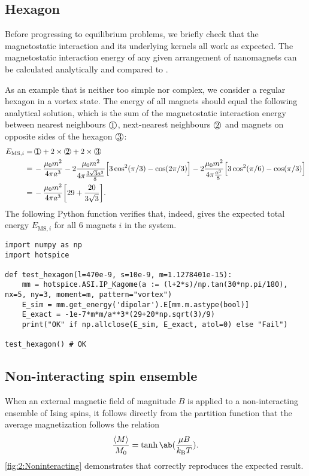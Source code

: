 \subsection{Hexagon}
Before progressing to equilibrium problems, we briefly check that the magnetostatic interaction and its underlying kernels all work as expected.
The magnetostatic interaction energy of any given arrangement of nanomagnets can be calculated analytically and compared to \hotspice. \par
As an example that is neither too simple nor complex, we consider a regular hexagon in a vortex state. The energy of all magnets should equal the following analytical solution, which is the sum of the magnetostatic interaction energy between nearest neighbours $\circled{1}$, next-nearest neighbours $\circled{2}$ and magnets on opposite sides of the hexagon $\circled{3}$:
\begin{align*}
	E_{\mathrm{MS},i} =&\, \circled{1} + 2 \times \circled{2} + 2 \times \circled{3} \\
	=&\, -\frac{\mu_0 m^2}{4\pi a^3} -2\frac{\mu_0 m^2}{4\pi \frac{3 \sqrt{3} a^3}{8}} \Big[3\cos^2(\pi/3) - \cos(2\pi/3)\Big] -2\frac{\mu_0 m^2}{4\pi \frac{a^3}{8}} \Big[3\cos^2(\pi/6) - \cos(\pi/3)\Big] \\
	=&\, -\frac{\mu_0 m^2}{4\pi a^3} \bigg[29+\frac{20}{3\sqrt{3}}\bigg] \mathrm{.}
\end{align*}
The following Python function verifies that, indeed, \hotspice gives the expected total energy $E_{\mathrm{MS},i}$ for all 6 magnets $i$ in the system.
\begin{lstlisting}
import numpy as np
import hotspice

def test_hexagon(l=470e-9, s=10e-9, m=1.1278401e-15):
	mm = hotspice.ASI.IP_Kagome(a := (l+2*s)/np.tan(30*np.pi/180), nx=5, ny=3, moment=m, pattern="vortex")
	E_sim = mm.get_energy('dipolar').E[mm.m.astype(bool)]
	E_exact = -1e-7*m*m/a**3*(29+20*np.sqrt(3)/9)
	print("OK" if np.allclose(E_sim, E_exact, atol=0) else "Fail")

test_hexagon() # OK
\end{lstlisting}

\subsection{Non-interacting spin ensemble}

When an external magnetic field of magnitude $B$ is applied to a non-interacting ensemble of Ising spins, it follows directly from the partition function that the average magnetization follows the relation
\begin{equation}
	\frac{\langle M \rangle}{M_0} = \tanh\ab(\frac{\mu B}{\kBT}) \mathrm{.}
\end{equation}
\cref{fig:2:Noninteracting} demonstrates that \hotspice{} correctly reproduces the expected result.

